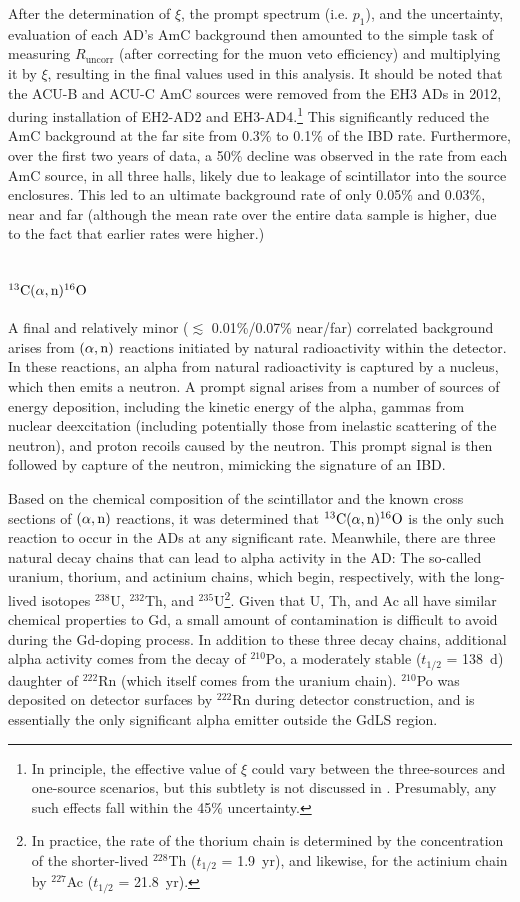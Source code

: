 \documentclass[../thesis.tex]{subfiles}
\begin{document}
After the determination of $\xi$, the prompt spectrum (i.e. $p_1$), and the
uncertainty, evaluation of each AD's AmC background then amounted to the simple
task of measuring $R_{\mathrm{uncorr}}$ (after correcting for the muon veto
efficiency) and multiplying it by $\xi$, resulting in the final values used in
this analysis. It should be noted that the ACU-B and ACU-C AmC sources were
removed from the EH3 ADs in 2012, during installation of EH2-AD2 and
EH3-AD4.\footnote{In principle, the effective value of $\xi$ could vary between
  the three-sources and one-source scenarios, but this subtlety is not discussed
  in \cite{Gu_2016}. Presumably, any such effects fall within the 45\%
  uncertainty.} This significantly reduced the AmC background at the far site
from 0.3\% to 0.1\% of the IBD rate. Furthermore, over the first two years of
data, a 50\% decline was observed in the rate from each AmC source, in all three
halls, likely due to leakage of scintillator into the source enclosures. This
led to an ultimate background rate of only 0.05\% and 0.03\%, near and far
(although the mean rate over the entire data sample is higher, due to the fact
that earlier rates were higher.)

\section{$^{13}\mathrm{C}(\alpha, \mathrm{n})^{16}\mathrm{O}$}
\label{sec:bkgCanO}

A final and relatively minor ($\lesssim$ 0.01\%/0.07\% near/far) correlated
background arises from $(\alpha,\mathrm{n})$ reactions initiated by natural radioactivity
within the detector. In these reactions, an alpha from natural radioactivity is
captured by a nucleus, which then emits a neutron. A prompt signal arises from a
number of sources of energy deposition, including the kinetic energy of the
alpha, gammas from nuclear deexcitation (including potentially those from
inelastic scattering of the neutron), and proton recoils caused by the
neutron. This prompt signal is then followed by capture of the neutron,
mimicking the signature of an IBD.

Based on the chemical composition of the scintillator and the known cross
sections of $(\alpha,\mathrm{n})$ reactions, it was determined that $^{13}\mathrm{C}(\alpha, \mathrm{n})^{16}\mathrm{O}$ is the only such
reaction to occur in the ADs at any significant rate. Meanwhile, there are three
natural decay chains that can lead to alpha activity in the AD: The so-called
uranium, thorium, and actinium chains, which begin, respectively, with the
long-lived isotopes $^{238}$U, $^{232}$Th, and $^{235}$U\footnote{In practice,
  the rate of the thorium chain is determined by the concentration of the
  shorter-lived $^{228}$Th ($t_{1/2}$ = 1.9~yr), and likewise, for the actinium
  chain by $^{227}$Ac ($t_{1/2}$ = 21.8~yr).}. Given that U, Th, and Ac all have
similar chemical properties to Gd, a small amount of contamination is difficult
to avoid during the Gd-doping process. In addition to these three decay chains,
additional alpha activity comes from the decay of $^{210}$Po, a moderately
stable ($t_{1/2}$ = 138~d) daughter of $^{222}$Rn (which itself comes from the
uranium chain). $^{210}$Po was deposited on detector surfaces by $^{222}$Rn
during detector construction, and is essentially the only significant alpha
emitter outside the GdLS region.
\end{document}

